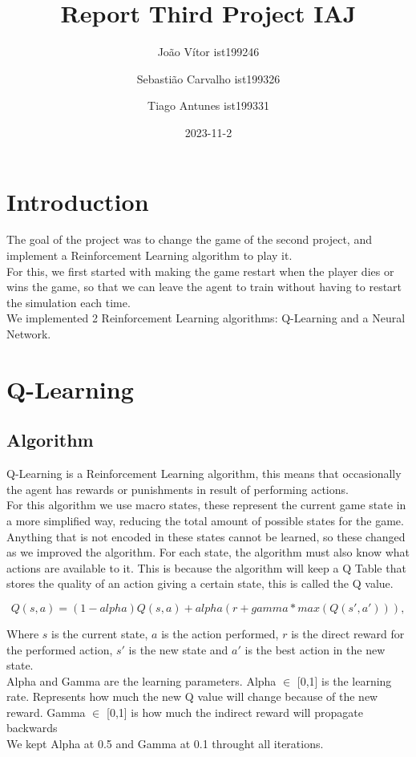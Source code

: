 \documentclass{article}
\title{Report Third Project IAJ}
\author{João Vítor ist199246
  \and Sebastião Carvalho ist199326
  \and Tiago Antunes ist199331}
\date{2023-11-2}
\begin{document}
  \maketitle
  \tableofcontents
  \newpage
  \section{Introduction}
  The goal of the project was to change the game of the second project, and implement a Reinforcement Learning algorithm to play it.\\
  For this, we first started with making the game restart when the player dies or wins the game, so that we can leave the agent to train
  without having to restart the simulation each time.\\
  We implemented 2 Reinforcement Learning algorithms: Q-Learning and a Neural Network.\\
  \section{Q-Learning}
  \subsection{Algorithm}
  Q-Learning is a Reinforcement Learning algorithm, this means that occasionally the agent has rewards or punishments in result of
  performing actions.\\
  For this algorithm we use macro states, these represent the current game state in a more simplified way, reducing the total
  amount of possible states for the game. Anything that is not encoded in these states cannot be learned, so these changed as
  we improved the algorithm. For each state, the algorithm must also know what actions are available to it. This is because the
  algorithm will keep a Q Table that stores the quality of an action giving a certain state, this is called the Q value.

  \[Q(s,a) = (1-alpha)Q(s, a) + alpha(r + gamma * max(Q(s', a'))),\]

  Where $s$ is the current state, $a$ is the action performed, $r$ is the direct reward for the performed action,
  $s'$ is the new state and $a'$ is the best action in the new state.\\
  Alpha and Gamma are the learning parameters.
  Alpha $\in$ [0,1] is the learning rate. Represents how much the new Q value will change because of the new reward.
  Gamma $\in$ [0,1] is how much the indirect reward will propagate backwards\\
  We kept Alpha at 0.5 and Gamma at 0.1 throught all iterations.
  
\end{document}
